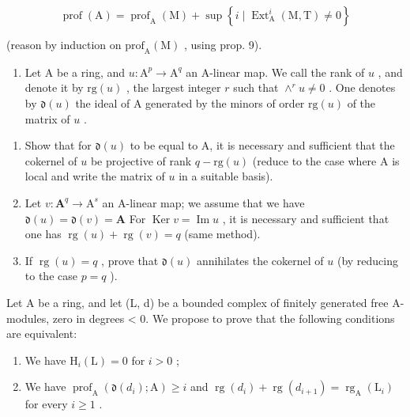 \[
\operatorname{prof} (\mathrm{A}) = \operatorname{prof} _ {\mathrm{A}} (\mathrm{M}) + \sup \left\{i \mid \operatorname{Ext} _ {\mathrm{A}} ^ {i} (\mathrm{M}, \mathrm{T}) \neq 0 \right\}
\]

(reason by induction on \(\mathrm{prof}_{\mathrm{A}}(\mathrm{M})\) , using prop. 9).

\begin{enumerate}
\def\labelenumi{\arabic{enumi})}
\setcounter{enumi}{7}
\tightlist
\item
  Let A be a ring, and \(u: \mathrm{A}^p \to \mathrm{A}^q\) an A-linear map. We call the rank of \(u\) , and denote it by \(\text{rg}(u)\) , the largest integer \(r\) such that \(\wedge^r u \neq 0\) . One denotes by \(\mathfrak{d}(u)\) the ideal of A generated by the minors of order \(\text{rg}(u)\) of the matrix of \(u\) .
\end{enumerate}

\begin{enumerate}
\def\labelenumi{\alph{enumi})}
\item
  Show that for \(\mathfrak{d}(u)\) to be equal to A, it is necessary and sufficient that the cokernel of \(u\) be projective of rank \(q - \mathrm{rg}(u)\) (reduce to the case where \(\mathrm{A}\) is local and write the matrix of \(u\) in a suitable basis).
\item
  Let \(v: \mathbf{A}^q \to \mathrm{A}^s\) an A-linear map; we assume that we have \(\mathfrak{d}(u) = \mathfrak{d}(v) = \mathbf{A}\) For \(\operatorname{Ker} v = \operatorname{Im} u\) , it is necessary and sufficient that one has \(\operatorname{rg}(u) + \operatorname{rg}(v) = q\) (same method).
\item
  If \(\operatorname{rg}(u) = q\) , prove that \(\mathfrak{d}(u)\) annihilates the cokernel of \(u\) (by reducing to the case \(p = q\) ).
\end{enumerate}

Let A be a ring, and let (L, d) be a bounded complex of finitely generated free A-modules, zero in degrees \textless{} 0. We propose to prove that the following conditions are equivalent:

\begin{enumerate}
\def\labelenumi{(\roman{enumi})}
\item
  We have \(\mathrm{H}_i(\mathrm{L}) = 0\) for \(i > 0\) ;
\item
  We have \(\operatorname{prof}_{\mathrm{A}}(\mathfrak{d}(d_i); \mathrm{A}) \geqslant i\) and \(\operatorname{rg}(d_i) + \operatorname{rg}(d_{i+1}) = \operatorname{rg}_{\mathrm{A}}(\mathrm{L}_i)\) for every \(i \geqslant 1\) .
\end{enumerate}

